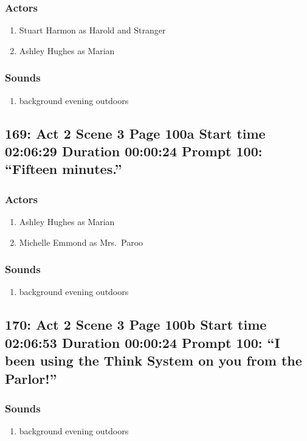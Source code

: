 \subsubsection{Actors}
\begin{enumerate}
\item Stuart Harmon as Harold and Stranger
\item Ashley Hughes as Marian
\end{enumerate}

\subsubsection{Sounds}
\begin{enumerate}
\item background evening outdoors
\end{enumerate}
\subsection{169: Act 2 Scene 3 Page 100a Start time 02:06:29 Duration 00:00:24 Prompt 100: ``Fifteen minutes.''}

\subsubsection{Actors}
\begin{enumerate}
\item Ashley Hughes as Marian
\item Michelle Emmond as Mrs.~Paroo
\end{enumerate}

\subsubsection{Sounds}
\begin{enumerate}
\item background evening outdoors
\end{enumerate}
\subsection{170: Act 2 Scene 3 Page 100b Start time 02:06:53 Duration 00:00:24 Prompt 100: ``I been using the Think System on you from the Parlor!''}
\subsubsection{Sounds}
\begin{enumerate}
\item background evening outdoors
\end{enumerate}
